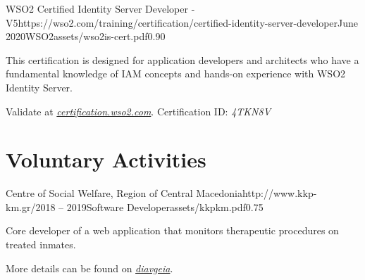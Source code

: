 \documentclass{mycv}
\begin{document}
	\vspace{0.5cm}

	\begin{EntryDatedLogo}{WSO2 Certified Identity Server Developer - V5}{https://wso2.com/training/certification/certified-identity-server-developer}{June 2020}{WSO2}{assets/wso2is-cert.pdf}{0.90}
		\begin{Itemize}
			\item This certification is designed for application developers and architects who have a fundamental knowledge of IAM concepts and hands-on experience with WSO2 Identity Server. 
			\item Validate at \href{https://certification.wso2.com}{\textit{certification.wso2.com}}. Certification ID: \textit{4TKN8V}
		\end{Itemize}
	\end{EntryDatedLogo}

	\section{Voluntary Activities}
	\begin{EntryDatedLogo}{Centre of Social Welfare, Region of Central Macedonia}{http://www.kkp-km.gr/}{2018 -- 2019}{Software Developer}{assets/kkpkm.pdf}{0.75}
		\begin{Itemize}
			\item Core developer of a web application that monitors therapeutic procedures on treated inmates.
			\item More details can be found on \href{https://diavgeia.gov.gr/decision/view/\%CE\%A8\%CE\%A6\%CE\%A1\%CE\%93\%CE\%9F\%CE\%9E\%CE\%A7\%CE\%A3-\%CE\%A0\%CE\%93\%CE\%A6}{\textit{diavgeia}}.
		\end{Itemize}
	\end{EntryDatedLogo}
\end{document}
